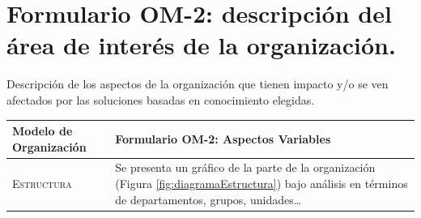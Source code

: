  
\section{Formulario OM-2: descripción del área de interés de la organización.}

Descripción de los aspectos de la organización que tienen impacto y/o se ven afectados
  por las soluciones basadas en conocimiento elegidas.


\begin{table}[H]
\scriptsize
\begin{tabularx}{\textwidth}{|l|X|} \hline
\textbf{Modelo de Organización} & \textbf{Formulario OM-2: Aspectos Variables} \\ \hline\hline

\textsc{Estructura} & Se presenta un gráfico de la parte de la organización (Figura \ref{fig:diagramaEstructura}) bajo análisis en términos de departamentos, grupos, unidades\dots\\ \hline


\end{tabularx}
\end{table}
